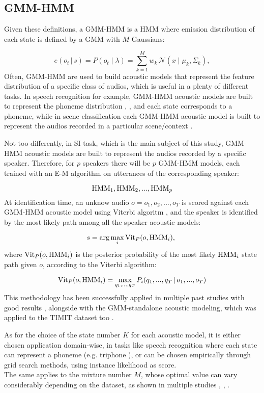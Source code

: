 \subsection{GMM-HMM} 
Given these definitions, a GMM-HMM is a HMM where emission distribution of each state is defined by a GMM with $M$ Gaussians:

$$e(o_t \, | \, s) = P(o_t \mid \lambda)=\sum_{k=1}^{M} w_{k} \, \mathcal{N}\left(x \mid \mu_{k}, \Sigma_{k}\right),$$
Often, GMM-HMM are used to build acoustic models that represent the feature distribution of a specific class of audios, which is useful in a plenty of different tasks. In speech recognition for example, GMM-HMM acoustic models are built to represent the phoneme distribution \cite{gmmhmmspeechrecognition}, \cite{asr:dnnhmm0}, and each state corresponds to a phoneme, while in scene classification each GMM-HMM acoustic model is built to represent the audios recorded in a particular scene/context \cite{dnnhmmscene}. 

Not too differently, in SI task, which is the main subject of this study, GMM-HMM acoustic models are built to represent the audios recorded by a specific speaker. Therefore, for $p$ speakers there will be $p$ GMM-HMM models, each trained with an E-M algorithm on utterances of the corresponding speaker:

$$\operatorname{HMM}_1, \operatorname{HMM}_2, ..., \operatorname{HMM}_p$$
At identification time, an unknow audio $o = o_1, o_2, ..., o_T$ is scored against each GMM-HMM acoustic model using Viterbi algoritm \cite{gmmhmmspeakeridentification}, and the speaker is identified by the most likely path among all the speaker acoustic models:

$$s = \arg \max_i \operatorname{Vit}_P(o, \operatorname{HMM}_i) \text{, }$$
where $\operatorname{Vit}_P(o, \operatorname{HMM}_i)$ is the posterior probability of the most likely $\operatorname{HMM}_i$ state path given $o$, according to the Viterbi algorithm:

$$\operatorname{Vit}_P(o, \operatorname{HMM}_i) = \max_{q_1, ..., q_T} P_{i}(q_1, ..., q_T \, | \, o_1, ..., o_T)$$
This methodology has been successfully applied in multiple past studies with good results \cite{gmmhmmspeakeridentification}, alongside with the GMM-standalone acoustic modeling, which was applied to the TIMIT dataset too \cite{gmmspeakeridentification}.

As for the choice of the state number $K$ for each acoustic model, it is either chosen application domain-wise, in tasks like speech recognition where each state can represent a phoneme (e.g. triphone \cite{asr:triphone}), or can be chosen empirically through grid search methods, using instance likelihood as score.
\\The same applies to the mixture number $M$, whose optimal value can vary considerably depending on the dataset, as shown in multiple studies \cite{si:gmmhmm1}, \cite{si:gmmhmm2}, \cite{polishasr:gmmhmm}.

